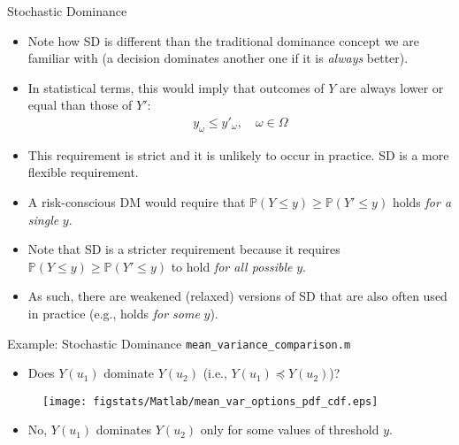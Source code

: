 \documentclass[handout,9pt]{beamer}
\begin{document}
%
\begin{frame}{Stochastic Dominance}

\begin{itemize}
\setlength{\itemsep}{10pt}
\item Note how SD is different than the traditional dominance concept we are familiar with (a decision dominates another one if it is {\em always} better). 

\item In statistical terms, this would imply that outcomes of $Y$ are always lower or equal than those of $Y'$:
\begin{align*}
y_{\omega}\leq y'_\omega,\quad \omega \in \Omega
\end{align*}
\item This requirement is strict and it is unlikely to occur in practice. SD is a more flexible requirement. 
\item A risk-conscious DM would require that $\mathbb{P}(Y\leq y)\geq \mathbb{P}(Y'\leq y)$ holds {\em for a single} $y$. 

\item Note that SD is a stricter requirement because it requires $\mathbb{P}(Y\leq y)\geq \mathbb{P}(Y'\leq y)$ to hold {\em for all possible} $y$. 

\item As such, there are weakened (relaxed) versions of SD that are also often used in practice (e.g., holds {\em for some} $y$).  
\end{itemize}


\end{frame}

%
\begin{frame}{Example: Stochastic Dominance \footnotesize{\texttt{mean\_variance\_comparison.m}}}

\begin{itemize}
\item Does $Y(u_1)$ dominate $Y(u_2)$ (i.e., $Y(u_1)\preceq Y(u_2)$)? 
\end{itemize}
\begin{figure}[!htb]
    \centering
	\texttt{[image: figstats/Matlab/mean\_var\_options\_pdf\_cdf.eps]}
\end{figure}
\pause 
\begin{itemize}
\item No, $Y(u_1)$ dominates $Y(u_2)$ only for some values of threshold $y$.
\end{itemize}


\end{frame}
\end{document}
